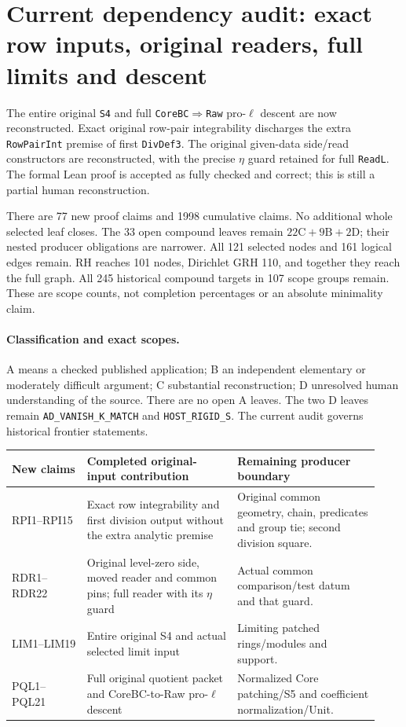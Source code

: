 \section{Current dependency audit: exact row inputs, original readers, full limits and descent}
\label{sec:dependency-audit-v39}

The entire original \texttt{S4} and full
\texttt{CoreBC}$\Rightarrow$\texttt{Raw} pro-$\ell$ descent
are now reconstructed. Exact original row-pair integrability
discharges the extra \texttt{RowPairInt} premise of first
\texttt{DivDef3}. The original given-data side/read constructors
are reconstructed, with the precise $\eta$ guard retained for
full \texttt{ReadL}. The formal Lean proof is accepted as fully
checked and correct; this is still a partial human reconstruction.

There are 77 new proof claims and 1998 cumulative claims. 
No additional whole selected leaf closes. The 33 open compound
leaves remain $22\mathrm C+9\mathrm B+2\mathrm D$; their nested
producer obligations are narrower. All 121 selected nodes and
161 logical edges remain. RH reaches 101 nodes, Dirichlet GRH
110, and together they reach the full graph. All 245 historical
compound targets in 107 scope groups remain. These are scope
counts, not completion percentages or an absolute minimality claim.

\paragraph{Classification and exact scopes.}
A means a checked published application; B an independent
elementary or moderately difficult argument; C substantial
reconstruction; D unresolved human understanding of the source.
There are no open A leaves. The two D leaves remain
\texttt{AD\_VANISH\_K\_MATCH} and \texttt{HOST\_RIGID\_S}.
The current audit governs historical frontier statements.

\begin{longtable}{@{}p{0.19\linewidth}p{0.38\linewidth}p{0.36\linewidth}@{}}
\toprule
New claims & Completed original-input contribution & Remaining producer boundary\\
\midrule\endhead
RPI1--RPI15 & Exact row integrability and first division output without the extra analytic premise & Original common geometry, chain, predicates and group tie; second division square.\\
RDR1--RDR22 & Original level-zero side, moved reader and common pins; full reader with its $\eta$ guard & Actual common comparison/test datum and that guard.\\
LIM1--LIM19 & Entire original S4 and actual selected limit input & Limiting patched rings/modules and support.\\
PQL1--PQL21 & Full original quotient packet and CoreBC-to-Raw pro-$\ell$ descent & Normalized Core patching/S5 and coefficient normalization/Unit.\\
\bottomrule
\end{longtable}

